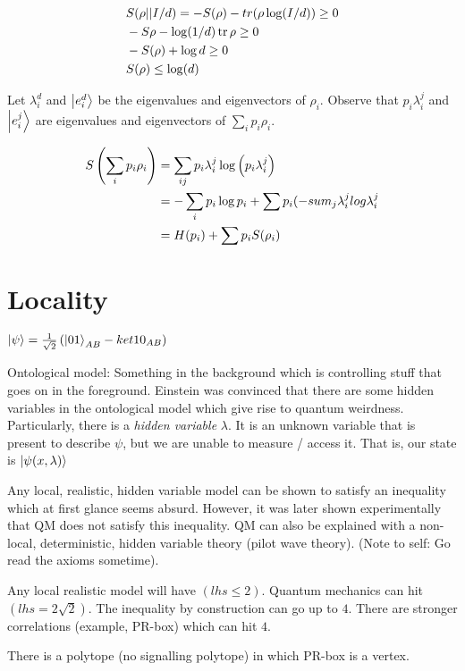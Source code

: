 \begin{align*}
&S(\rho || I/d) = -S(\rho) -tr(\rho \log(I/d)) \geq 0 \\
& -S \rho -\log(1/d) \tr \rho \geq 0 \\
&-S(\rho) + \log d \geq 0 \\
&S(\rho) \leq \log(d)
\end{align*}

Let $\lambda_i^d$ and $\ket{e_i^d}$ be the eigenvalues and eigenvectors of $\rho_i$.
Observe that $p_i \lambda_i^j$ and $\ket{e_i^j}$ are eigenvalues and 
eigenvectors of $\sum_i p_i \rho_i$. 

\begin{align*}
S \left(\sum_i p_i \rho_i\right) &= \sum_{ij} p_{i} \lambda_{i}^j \log \left( p_i \lambda_i^j \right) \\
&= - \sum_i p_i \log p_i + \sum p_i (-sum_j \lambda_i^j log \lambda_i^j \\
&= H(p_i) + \sum p_i S(\rho_i)
\end{align*}

\chapter{Locality}

$\ket{\psi} = \frac{1}{\sqrt2} \left( \ket{01}_{AB} - ket{10}_{AB} \right)$

Ontological model: Something in the background which is controlling stuff that
goes on in the foreground. Einstein was convinced that there are some hidden
variables in the ontological model which give rise to quantum weirdness.
Particularly, there is a \emph{hidden variable} $\lambda$. It is an unknown 
variable that is present to describe $\psi$, but we are unable to measure /
access it. That is, our state is $\ket{\psi(x, \lambda)}$

Any local, realistic, hidden variable model can be shown to satisfy an
inequality which at first glance seems absurd. However, it was later shown
experimentally that QM does not satisfy this inequality.
QM can also be explained with a non-local, deterministic, hidden variable
theory (pilot wave theory). (Note to self: Go read the axioms sometime).

Any local realistic model will have $(lhs \leq 2)$. Quantum mechanics can
hit $(lhs = 2 \sqrt 2)$. The inequality by construction can go up to $4$.
There are stronger correlations (example, PR-box) which can hit $4$.

There is a polytope (no signalling polytope) in which PR-box is a vertex.


